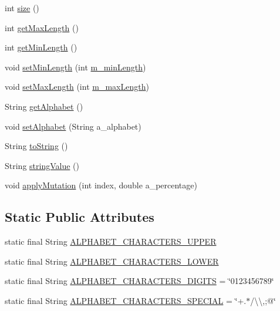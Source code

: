\begin{DoxyCompactItemize}
\item 
int \hyperlink{classorg_1_1jgap_1_1impl_1_1_string_gene_a96149f0c784d464b12a634ce09a7fa49}{size} ()
\item 
int \hyperlink{classorg_1_1jgap_1_1impl_1_1_string_gene_a4aa576613a1420441d260d18fc87aba1}{get\-Max\-Length} ()
\item 
int \hyperlink{classorg_1_1jgap_1_1impl_1_1_string_gene_aa4684e084dbe0603a1d404499dc0925d}{get\-Min\-Length} ()
\item 
void \hyperlink{classorg_1_1jgap_1_1impl_1_1_string_gene_aa956e39f237a8016a77c2e6cac3507d0}{set\-Min\-Length} (int \hyperlink{classorg_1_1jgap_1_1impl_1_1_string_gene_a25b50ba7f99ec2a0a8902688edabe789}{m\-\_\-min\-Length})
\item 
void \hyperlink{classorg_1_1jgap_1_1impl_1_1_string_gene_af0ecad31e5b6cd227b0846a596debd8f}{set\-Max\-Length} (int \hyperlink{classorg_1_1jgap_1_1impl_1_1_string_gene_a6fda44f967e3b24f41d0d0219e3d79d3}{m\-\_\-max\-Length})
\item 
String \hyperlink{classorg_1_1jgap_1_1impl_1_1_string_gene_a9d250da50471d01e5d7c554dc176a5a3}{get\-Alphabet} ()
\item 
void \hyperlink{classorg_1_1jgap_1_1impl_1_1_string_gene_a8ac7e863ae1ec200bfb100b87a828c04}{set\-Alphabet} (String a\-\_\-alphabet)
\item 
String \hyperlink{classorg_1_1jgap_1_1impl_1_1_string_gene_a7d7bc7856360c5889926a1cd83a38efa}{to\-String} ()
\item 
String \hyperlink{classorg_1_1jgap_1_1impl_1_1_string_gene_a9c6a36b0073458631e1ef61bb4b5c076}{string\-Value} ()
\item 
void \hyperlink{classorg_1_1jgap_1_1impl_1_1_string_gene_aa63ee177d2ac62ad5c82d38db881ba7f}{apply\-Mutation} (int index, double a\-\_\-percentage)
\end{DoxyCompactItemize}
\subsection*{Static Public Attributes}
\begin{DoxyCompactItemize}
\item 
static final String \hyperlink{classorg_1_1jgap_1_1impl_1_1_string_gene_a2da04c8cdfd00b3b7223ccf9e4bd0fad}{A\-L\-P\-H\-A\-B\-E\-T\-\_\-\-C\-H\-A\-R\-A\-C\-T\-E\-R\-S\-\_\-\-U\-P\-P\-E\-R}
\item 
static final String \hyperlink{classorg_1_1jgap_1_1impl_1_1_string_gene_a17b33f8263b78152111e5aa0d12b523a}{A\-L\-P\-H\-A\-B\-E\-T\-\_\-\-C\-H\-A\-R\-A\-C\-T\-E\-R\-S\-\_\-\-L\-O\-W\-E\-R}
\item 
static final String \hyperlink{classorg_1_1jgap_1_1impl_1_1_string_gene_a2a184eb88f4efc86a39a5ebdf73d4326}{A\-L\-P\-H\-A\-B\-E\-T\-\_\-\-C\-H\-A\-R\-A\-C\-T\-E\-R\-S\-\_\-\-D\-I\-G\-I\-T\-S} = \char`\"{}0123456789\char`\"{}
\item 
static final String \hyperlink{classorg_1_1jgap_1_1impl_1_1_string_gene_a48fcfb4a136db00befab3fd737f151b1}{A\-L\-P\-H\-A\-B\-E\-T\-\_\-\-C\-H\-A\-R\-A\-C\-T\-E\-R\-S\-\_\-\-S\-P\-E\-C\-I\-A\-L} = \char`\"{}+.$\ast$/\textbackslash{}\textbackslash{},;@\char`\"{}
\end{DoxyCompactItemize}
